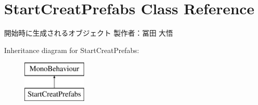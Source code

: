 \hypertarget{class_start_creat_prefabs}{}\section{Start\+Creat\+Prefabs Class Reference}
\label{class_start_creat_prefabs}


開始時に生成されるオブジェクト 製作者：冨田 大悟  


Inheritance diagram for Start\+Creat\+Prefabs\+:\begin{figure}[H]
\begin{center}
\leavevmode
\includegraphics[height=2.000000cm]{class_start_creat_prefabs}
\end{center}
\end{figure}
